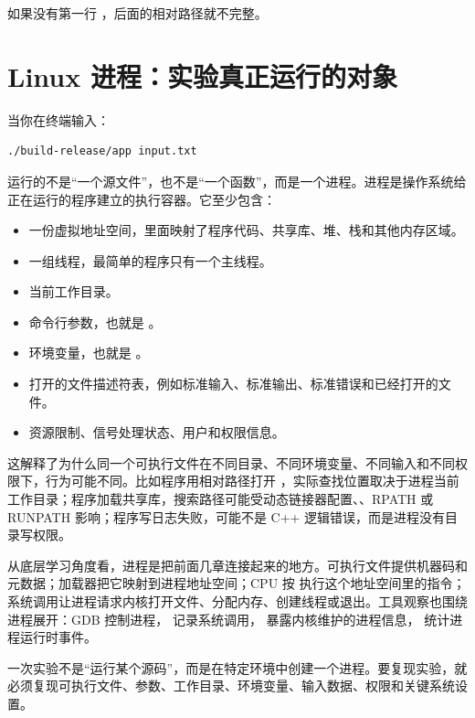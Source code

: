 如果没有第一行 ，后面的相对路径就不完整。

\section{Linux 进程：实验真正运行的对象}

当你在终端输入：

\begin{lstlisting}[language=bash]
./build-release/app input.txt
\end{lstlisting}

运行的不是“一个源文件”，也不是“一个函数”，而是一个进程。进程是操作系统给正在运行的程序建立的执行容器。它至少包含：

\begin{itemize}
  \item 一份虚拟地址空间，里面映射了程序代码、共享库、堆、栈和其他内存区域。
  \item 一组线程，最简单的程序只有一个主线程。
  \item 当前工作目录。
  \item 命令行参数，也就是 。
  \item 环境变量，也就是 。
  \item 打开的文件描述符表，例如标准输入、标准输出、标准错误和已经打开的文件。
  \item 资源限制、信号处理状态、用户和权限信息。
\end{itemize}

这解释了为什么同一个可执行文件在不同目录、不同环境变量、不同输入和不同权限下，行为可能不同。比如程序用相对路径打开 ，实际查找位置取决于进程当前工作目录；程序加载共享库，搜索路径可能受动态链接器配置、、RPATH 或 RUNPATH 影响；程序写日志失败，可能不是 C++ 逻辑错误，而是进程没有目录写权限。

从底层学习角度看，进程是把前面几章连接起来的地方。可执行文件提供机器码和元数据；加载器把它映射到进程地址空间；CPU 按  执行这个地址空间里的指令；系统调用让进程请求内核打开文件、分配内存、创建线程或退出。工具观察也围绕进程展开：GDB 控制进程， 记录系统调用， 暴露内核维护的进程信息， 统计进程运行时事件。

\begin{mentalmodel}
一次实验不是“运行某个源码”，而是在特定环境中创建一个进程。要复现实验，就必须复现可执行文件、参数、工作目录、环境变量、输入数据、权限和关键系统设置。
\end{mentalmodel}


